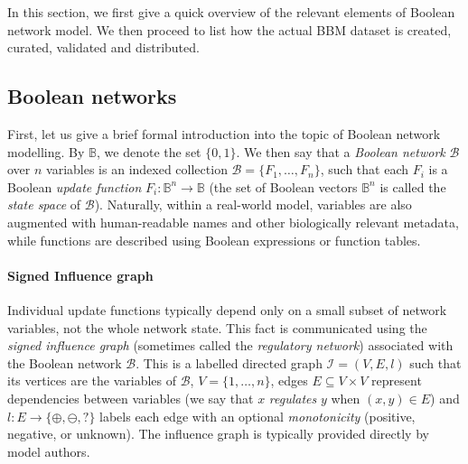 \documentclass[fleqn,10pt]{wlscirep}
\begin{document}
In this section, we first give a quick overview of the relevant elements of Boolean network model. We then proceed to list how the actual BBM dataset is created, curated, validated and distributed.

\subsection*{Boolean networks}


First, let us give a brief formal introduction into the topic of Boolean network modelling. By $\mathbb{B}$, we denote the set $\{0,1\}$. We then say that a \emph{Boolean network} $\mathcal{B}$ over $n$ variables is an indexed collection $\mathcal{B} = \{ F_1, \ldots, F_n \}$, such that each $F_i$ is a Boolean \emph{update function} $F_i  : \mathbb{B}^n \to \mathbb{B}$ (the set of Boolean vectors $\mathbb{B}^n$ is called the \emph{state space} of $\mathcal{B}$). Naturally, within a real-world model, variables are also augmented with human-readable names and other biologically relevant metadata, while functions are described using Boolean expressions or function tables.

\paragraph{Signed Influence graph} Individual update functions typically depend only on a small subset of network variables, not the whole network state. This fact is communicated using the \emph{signed influence graph} (sometimes called the \emph{regulatory network}) associated with the Boolean network $\mathcal{B}$. This is a labelled directed graph $\mathcal{I} = (V, E, l)$ such that its vertices are the variables of $\mathcal{B}$, $V = \{ 1, \ldots, n \}$, edges $E \subseteq V \times V$ represent dependencies between variables (we say that $x$ \emph{regulates} $y$ when $(x,y) \in E$) and $l : E \to \{ \oplus, \ominus, ? \}$ labels each edge with an optional \emph{monotonicity} (positive, negative, or unknown). The influence graph is typically provided directly by model authors.
\end{document}
